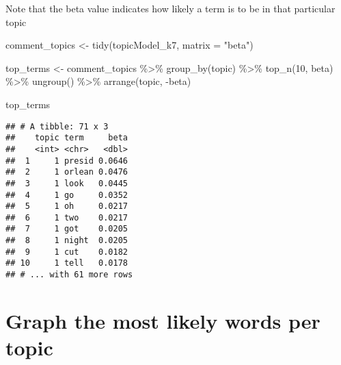 \documentclass[
]{article}
\newenvironment{Shaded}{\begin{snugshade}}{\end{snugshade}}
\newcommand{\AttributeTok}[1]{\textcolor[rgb]{0.77,0.63,0.00}{#1}}
\newcommand{\DecValTok}[1]{\textcolor[rgb]{0.00,0.00,0.81}{#1}}
\newcommand{\FunctionTok}[1]{\textcolor[rgb]{0.00,0.00,0.00}{#1}}
\newcommand{\NormalTok}[1]{#1}
\newcommand{\OtherTok}[1]{\textcolor[rgb]{0.56,0.35,0.01}{#1}}
\newcommand{\SpecialCharTok}[1]{\textcolor[rgb]{0.00,0.00,0.00}{#1}}
\newcommand{\StringTok}[1]{\textcolor[rgb]{0.31,0.60,0.02}{#1}}
\begin{document}
\begin{Shaded}
\end{Shaded}

Note that the beta value indicates how likely a term is to be in that
particular topic

\begin{Shaded}
\begin{Highlighting}[]
\NormalTok{comment\_topics }\OtherTok{\textless{}{-}} \FunctionTok{tidy}\NormalTok{(topicModel\_k7, }\AttributeTok{matrix =} \StringTok{"beta"}\NormalTok{)}

\NormalTok{top\_terms }\OtherTok{\textless{}{-}}\NormalTok{ comment\_topics }\SpecialCharTok{\%\textgreater{}\%}
  \FunctionTok{group\_by}\NormalTok{(topic) }\SpecialCharTok{\%\textgreater{}\%}
  \FunctionTok{top\_n}\NormalTok{(}\DecValTok{10}\NormalTok{, beta) }\SpecialCharTok{\%\textgreater{}\%}
  \FunctionTok{ungroup}\NormalTok{() }\SpecialCharTok{\%\textgreater{}\%}
  \FunctionTok{arrange}\NormalTok{(topic, }\SpecialCharTok{{-}}\NormalTok{beta)}

\NormalTok{top\_terms}
\end{Highlighting}
\end{Shaded}

\begin{verbatim}
## # A tibble: 71 x 3
##    topic term     beta
##    <int> <chr>   <dbl>
##  1     1 presid 0.0646
##  2     1 orlean 0.0476
##  3     1 look   0.0445
##  4     1 go     0.0352
##  5     1 oh     0.0217
##  6     1 two    0.0217
##  7     1 got    0.0205
##  8     1 night  0.0205
##  9     1 cut    0.0182
## 10     1 tell   0.0178
## # ... with 61 more rows
\end{verbatim}

\hypertarget{graph-the-most-likely-words-per-topic}{%
\section{Graph the most likely words per
topic}\label{graph-the-most-likely-words-per-topic}}
\end{document}
